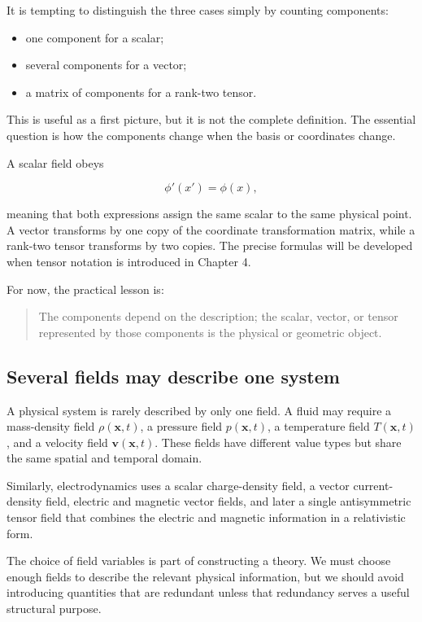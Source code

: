 It is tempting to distinguish the three cases simply by counting components:

\begin{itemize}
    \item one component for a scalar;
    \item several components for a vector;
    \item a matrix of components for a rank-two tensor.
\end{itemize}

This is useful as a first picture, but it is not the complete definition. The essential question is how the components change when the basis or coordinates change.

A scalar field obeys

\[
\phi'(x')=\phi(x),
\]

meaning that both expressions assign the same scalar to the same physical point. A vector transforms by one copy of the coordinate transformation matrix, while a rank-two tensor transforms by two copies. The precise formulas will be developed when tensor notation is introduced in Chapter 4.

For now, the practical lesson is:

\begin{quote}
The components depend on the description; the scalar, vector, or tensor represented by those components is the physical or geometric object.
\end{quote}

\subsection{Several fields may describe one system}

A physical system is rarely described by only one field. A fluid may require a mass-density field \(\rho(\mathbf{x},t)\), a pressure field \(p(\mathbf{x},t)\), a temperature field \(T(\mathbf{x},t)\), and a velocity field \(\mathbf{v}(\mathbf{x},t)\). These fields have different value types but share the same spatial and temporal domain.

Similarly, electrodynamics uses a scalar charge-density field, a vector current-density field, electric and magnetic vector fields, and later a single antisymmetric tensor field that combines the electric and magnetic information in a relativistic form.

The choice of field variables is part of constructing a theory. We must choose enough fields to describe the relevant physical information, but we should avoid introducing quantities that are redundant unless that redundancy serves a useful structural purpose.

